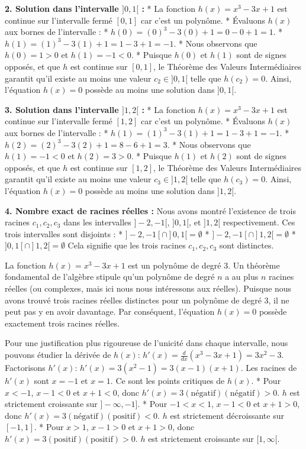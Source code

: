 \documentclass[12pt,a4paper]{report}
\begin{document}
\textbf{2. Solution dans l'intervalle $]0, 1[$ :}
*   La fonction $h(x) = x^3 - 3x + 1$ est continue sur l'intervalle fermé $[0, 1]$ car c'est un polynôme.
*   Évaluons $h(x)$ aux bornes de l'intervalle :
    *   $h(0) = (0)^3 - 3(0) + 1 = 0 - 0 + 1 = 1$.
    *   $h(1) = (1)^3 - 3(1) + 1 = 1 - 3 + 1 = -1$.
*   Nous observons que $h(0) = 1 > 0$ et $h(1) = -1 < 0$.
*   Puisque $h(0)$ et $h(1)$ sont de signes opposés, et que $h$ est continue sur $[0, 1]$, le Théorème des Valeurs Intermédiaires garantit qu'il existe au moins une valeur $c_2 \in ]0, 1[$ telle que $h(c_2) = 0$.
    Ainsi, l'équation $h(x)=0$ possède au moins une solution dans $]0, 1[$.

\textbf{3. Solution dans l'intervalle $]1, 2[$ :}
*   La fonction $h(x) = x^3 - 3x + 1$ est continue sur l'intervalle fermé $[1, 2]$ car c'est un polynôme.
*   Évaluons $h(x)$ aux bornes de l'intervalle :
    *   $h(1) = (1)^3 - 3(1) + 1 = 1 - 3 + 1 = -1$.
    *   $h(2) = (2)^3 - 3(2) + 1 = 8 - 6 + 1 = 3$.
*   Nous observons que $h(1) = -1 < 0$ et $h(2) = 3 > 0$.
*   Puisque $h(1)$ et $h(2)$ sont de signes opposés, et que $h$ est continue sur $[1, 2]$, le Théorème des Valeurs Intermédiaires garantit qu'il existe au moins une valeur $c_3 \in ]1, 2[$ telle que $h(c_3) = 0$.
    Ainsi, l'équation $h(x)=0$ possède au moins une solution dans $]1, 2[$.

\textbf{4. Nombre exact de racines réelles :}
Nous avons montré l'existence de trois racines $c_1, c_2, c_3$ dans les intervalles $]-2, -1[$, $]0, 1[$, et $]1, 2[$ respectivement. Ces trois intervalles sont disjoints :
*   $]-2, -1[ \cap ]0, 1[ = \emptyset$
*   $]-2, -1[ \cap ]1, 2[ = \emptyset$
*   $]0, 1[ \cap ]1, 2[ = \emptyset$
Cela signifie que les trois racines $c_1, c_2, c_3$ sont distinctes.

La fonction $h(x) = x^3 - 3x + 1$ est un polynôme de degré 3. Un théorème fondamental de l'algèbre stipule qu'un polynôme de degré $n$ a au plus $n$ racines réelles (ou complexes, mais ici nous nous intéressons aux réelles).
Puisque nous avons trouvé trois racines réelles distinctes pour un polynôme de degré 3, il ne peut pas y en avoir davantage.
Par conséquent, l'équation $h(x) = 0$ possède exactement trois racines réelles.

Pour une justification plus rigoureuse de l'unicité dans chaque intervalle, nous pouvons étudier la dérivée de $h(x)$:
$h'(x) = \frac{d}{dx}(x^3 - 3x + 1) = 3x^2 - 3$.
Factorisons $h'(x)$: $h'(x) = 3(x^2 - 1) = 3(x-1)(x+1)$.
Les racines de $h'(x)$ sont $x=-1$ et $x=1$. Ce sont les points critiques de $h(x)$.
*   Pour $x < -1$, $x-1 < 0$ et $x+1 < 0$, donc $h'(x) = 3(\text{négatif})(\text{négatif}) > 0$. $h$ est strictement croissante sur $]-\infty, -1]$.
*   Pour $-1 < x < 1$, $x-1 < 0$ et $x+1 > 0$, donc $h'(x) = 3(\text{négatif})(\text{positif}) < 0$. $h$ est strictement décroissante sur $[-1, 1]$.
*   Pour $x > 1$, $x-1 > 0$ et $x+1 > 0$, donc $h'(x) = 3(\text{positif})(\text{positif}) > 0$. $h$ est strictement croissante sur $[1, \infty[$.
\end{document}
